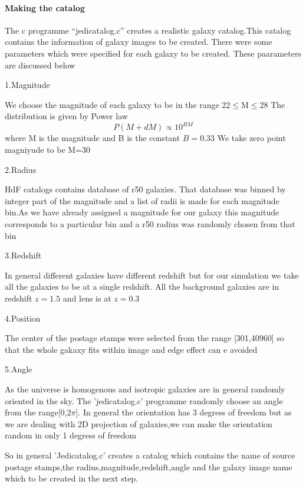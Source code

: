 \paragraph{Making the catalog}

  The c programme ``jedicatalog.c'' creates a realistic galaxy catalog.This catalog contains the information of galaxy images to be created. There were some parameters which were specified for each galaxy to be created. These paarameters are
discussed below

1.Magnitude

  We choose the magnitude of each galaxy to be in the range 22$\leq$M$\leq$28
The distribution is given by Power law
\begin{equation}
 P(M+dM)\propto 10^{BM}
 \end{equation}
 where M is the magnitude and B is the constant $ B = 0.33 $
We take zero point magniyude to be M=30

2.Radius

  HdF catalogs contains database of r50 galaxies. That database was binned by integer part of the magnitude
and a list of  radii is made for each magnitude bin.As we have already assigned a magnitude for our galaxy this magnitude
corresponds to a particular bin and a r50 radius was randomly chosen from that bin

3.Redshift

 In general different galaxies have different redshift but for our simulation we take all the galaxies to be at
a single redshift. All the background galaxies are in redshift $ z = 1.5 $ and lens is at $ z= 0.3 $

4.Position

 The center of the postage stamps were selected from the range [301,40960] so that the whole gakaxy fits within image and edge effect can e avoided

5.Angle

 As the universe is homogenous and isotropic galaxies are in general randomly oriented in the sky. The 'jedicatalog.c' programme randomly
choose an angle from the range[0,2$\pi$]. In general the orientation has 3 degress of freedom but as we are dealing with 2D projection of galaxies,we can make the orientation random in only 1 degress of freedom

So in general 'Jedicatalog.c' creates a catalog which contains the name of source postage stamps,the radius,magnitude,redshift,angle and the galaxy image name which to be created in the next step.

